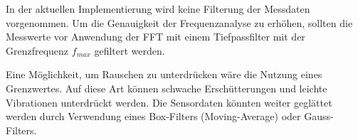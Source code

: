 In der aktuellen Implementierung wird keine Filterung der Messdaten vorgenommen. 
Um die Genauigkeit der Frequenzanalyse zu erhöhen, sollten die Messwerte vor Anwendung der FFT mit einem Tiefpassfilter mit der Grenzfrequenz $f_{max}$ gefiltert werden.

Eine Möglichkeit, um Rauschen zu unterdrücken wäre die Nutzung eines Grenzwertes. Auf diese Art können schwache Erschütterungen und leichte Vibrationen unterdrückt werden.
Die Sensordaten könnten weiter geglättet werden durch Verwendung eines Box-Filters (Moving-Average) oder Gauss-Filters.




